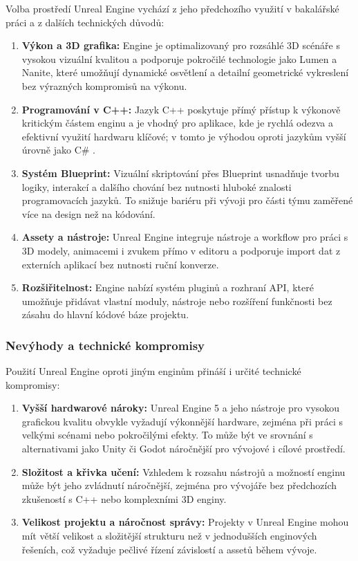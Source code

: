 Volba prostředí Unreal Engine vychází z jeho předchozího využití v bakalářské práci \cite{Jochec2023} a z dalších technických důvodů:

\begin{enumerate}
    \item \textbf{Výkon a 3D grafika:} Engine je optimalizovaný pro rozsáhlé 3D scénáře s vysokou vizuální kvalitou a podporuje pokročilé technologie jako Lumen a Nanite, které umožňují dynamické osvětlení a detailní geometrické vykreslení bez výrazných kompromisů na výkonu.
    \item \textbf{Programování v C++:} Jazyk C++ poskytuje přímý přístup k výkonově kritickým částem enginu a je vhodný pro aplikace, kde je rychlá odezva a efektivní využití hardwaru klíčové; v tomto je výhodou oproti jazykům vyšší úrovně jako C\# .
    \item \textbf{Systém Blueprint:} Vizuální skriptování přes Blueprint usnadňuje tvorbu logiky, interakcí a dalšího chování bez nutnosti hluboké znalosti programovacích jazyků. To snižuje bariéru při vývoji pro části týmu zaměřené více na design než na kódování.
    \item \textbf{Assety a nástroje:} Unreal Engine integruje nástroje a workflow pro práci s 3D modely, animacemi i zvukem přímo v editoru a podporuje import dat z externích aplikací bez nutnosti ruční konverze.
    \item \textbf{Rozšiřitelnost:} Engine nabízí systém pluginů a rozhraní API, které umožňuje přidávat vlastní moduly, nástroje nebo rozšíření funkčnosti bez zásahu do hlavní kódové báze projektu.
\end{enumerate}

\subsubsection{Nevýhody a technické kompromisy}

Použití Unreal Engine oproti jiným enginům přináší i určité technické kompromisy:

\begin{enumerate}
    \item \textbf{Vyšší hardwarové nároky:} Unreal Engine 5 a jeho nástroje pro vysokou grafickou kvalitu obvykle vyžadují výkonnější hardware, zejména při práci s velkými scénami nebo pokročilými efekty. To může být ve srovnání s alternativami jako Unity či Godot náročnější pro vývojové i cílové prostředí.
    \item \textbf{Složitost a křivka učení:} Vzhledem k rozsahu nástrojů a možností enginu může být jeho zvládnutí náročnější, zejména pro vývojáře bez předchozích zkušeností s C++ nebo komplexními 3D enginy.
    \item \textbf{Velikost projektu a náročnost správy:} Projekty v Unreal Engine mohou mít větší velikost a složitější strukturu než v jednodušších enginových řešeních, což vyžaduje pečlivé řízení závislostí a assetů během vývoje.
\end{enumerate}

